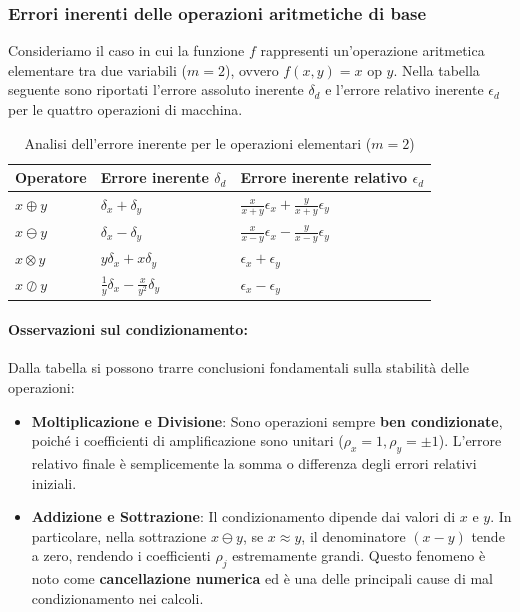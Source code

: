 \documentclass[a4paper,12pt]{article}
\begin{document}
	\subsubsection{Errori inerenti delle operazioni aritmetiche di base}
	
	Consideriamo il caso in cui la funzione $f$ rappresenti un'operazione aritmetica elementare tra due variabili ($m=2$), ovvero $f(x, y) = x \text{ op } y$. Nella tabella seguente sono riportati l'errore assoluto inerente $\delta_d$ e l'errore relativo inerente $\epsilon_d$ per le quattro operazioni di macchina.
	
	\begin{table}[h!]
		\centering
		\renewcommand{\arraystretch}{2} %
		\begin{tabular}{l l l}
			\toprule
			\textbf{Operatore} & \textbf{Errore inerente} $\delta_d$ & \textbf{Errore inerente relativo} $\epsilon_d$ \\
			\midrule
			$x \oplus y$ & $\delta_x + \delta_y$ & $\displaystyle \frac{x}{x+y}\epsilon_x + \frac{y}{x+y}\epsilon_y$ \\
			
			$x \ominus y$ & $\delta_x - \delta_y$ & $\displaystyle \frac{x}{x-y}\epsilon_x - \frac{y}{x-y}\epsilon_y$ \\
			
			$x \otimes y$ & $y\delta_x + x\delta_y$ & $\epsilon_x + \epsilon_y$ \\
			
			$x \oslash y$ & $\displaystyle \frac{1}{y}\delta_x - \frac{x}{y^2}\delta_y$ & $\epsilon_x - \epsilon_y$ \\
			\bottomrule
		\end{tabular}
		\caption{Analisi dell'errore inerente per le operazioni elementari ($m=2$)}
	\end{table}
	
	\paragraph{Osservazioni sul condizionamento:}
	Dalla tabella si possono trarre conclusioni fondamentali sulla stabilità delle operazioni:
	\begin{itemize}
		\item \textbf{Moltiplicazione e Divisione}: Sono operazioni sempre \textbf{ben condizionate}, poiché i coefficienti di amplificazione sono unitari ($\rho_x = 1, \rho_y = \pm 1$). L'errore relativo finale è semplicemente la somma o differenza degli errori relativi iniziali.
		\item \textbf{Addizione e Sottrazione}: Il condizionamento dipende dai valori di $x$ e $y$. In particolare, nella sottrazione $x \ominus y$, se $x \approx y$, il denominatore $(x-y)$ tende a zero, rendendo i coefficienti $\rho_j$ estremamente grandi. Questo fenomeno è noto come \textbf{cancellazione numerica} ed è una delle principali cause di mal condizionamento nei calcoli.
	\end{itemize}
\end{document}
